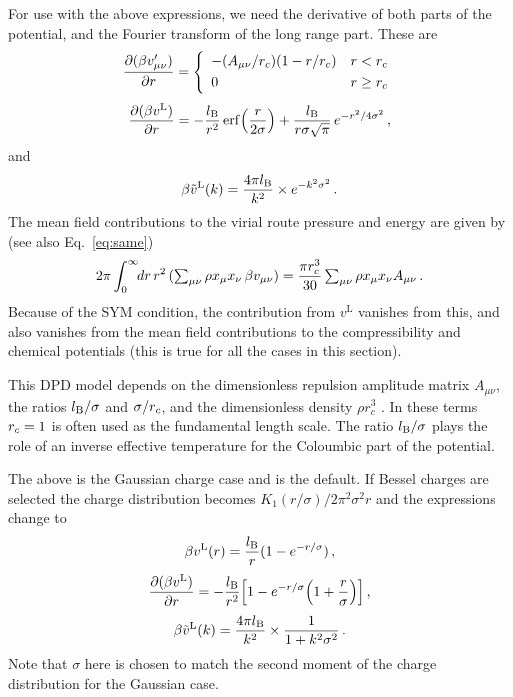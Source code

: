 \documentclass[12pt,a4paper]{article}
\DeclareMathOperator{\erf}{erf}
\newcommand{\lr}{^{\mathrm{L}}}
\newcommand{\Eqref}[1]{Eq.~\eqref{#1}}
\begin{document}
For use with the above expressions, we need the derivative of both
parts of the potential, and the Fourier transform of the long range
part.  These are
%
\begin{equation}
\frac{\partial(\beta v_{\mu\nu}')}{\partial r}=
\left\{\begin{array}{ll}
-(A_{\mu\nu}/r_c)(1-r/r_c) & r<r_c\\[3pt]
0 & r \ge r_c
\end{array}\right.
\end{equation}
%
\begin{equation}
\frac{\partial(\beta v\lr)}{\partial r}=
-\frac{\lB}{r^2}
\erf\Bigl(\frac{r}{2\sigma}\Bigr)
+\frac{\lB}{r\sigma\sqrt\pi}\,
e^{-r^2/4\sigma^2}\,,
\end{equation}
%
and
%
\begin{equation}
\beta {\tilde v}\lr(k)=\frac{4\pi\lB}{k^2}\times e^{-k^2\sigma^2}\,.
\end{equation}
%
The mean field contributions to the virial route pressure and energy
are given by (see also \Eqref{eq:same})
%
\begin{equation}
{2\pi}\int_0^\infty\!\!dr\,r^2\,
({\textstyle \sum_{\mu\nu}}\,\rho x_\mu x_\nu\,\beta
  v_{\mu\nu})=\frac{\pi r_c^3}{30}\,{\textstyle
  \sum_{\mu\nu}}\,
\rho x_\mu x_\nu A_{\mu\nu}\,.
\end{equation}
%
Because of the SYM condition, the contribution from $v\lr$ vanishes
from this, and also vanishes from the mean field contributions to the
compressibility and chemical potentials (this is true for all the
cases in this section).

This DPD model depends on the dimensionless repulsion amplitude matrix
$A_{\mu\nu}$, the ratios $l_{\mathrm{B}}/\sigma$ and $\sigma/r_c$, and the
dimensionless density $\rho r_c^3$ \cite{WVA+13}.  In these terms
$r_c=1$ is often used as the fundamental length scale.  The ratio
$l_{\mathrm{B}}/\sigma$ plays the role of an inverse effective temperature for
the Coloumbic part of the potential.

The above is the Gaussian charge case and is the default.  If Bessel
charges are selected the charge distribution becomes $K_1(r/\sigma) /
2\pi^2\sigma^2 r$ and the expressions change to \cite{WV14}
%
\begin{equation}
\beta v\lr(r)=\frac{\lB}{r}(1-e^{-r/\sigma})\,,
\end{equation}
%
\begin{equation}
\frac{\partial(\beta v\lr)}{\partial r}=
-\frac{\lB}{r^2}\Bigl[1-e^{-r/\sigma}\Bigl(1+\frac{r}{\sigma}\Bigr)\Bigr]\,,
\end{equation}
%
\begin{equation}
\beta {\tilde v}\lr(k)=\frac{4\pi\lB}{k^2}\times\frac{1}{1+k^2\sigma^2}\,.
\end{equation}
%
Note that $\sigma$ here is chosen to match the second moment of the
charge distribution for the Gaussian case.
\end{document}
